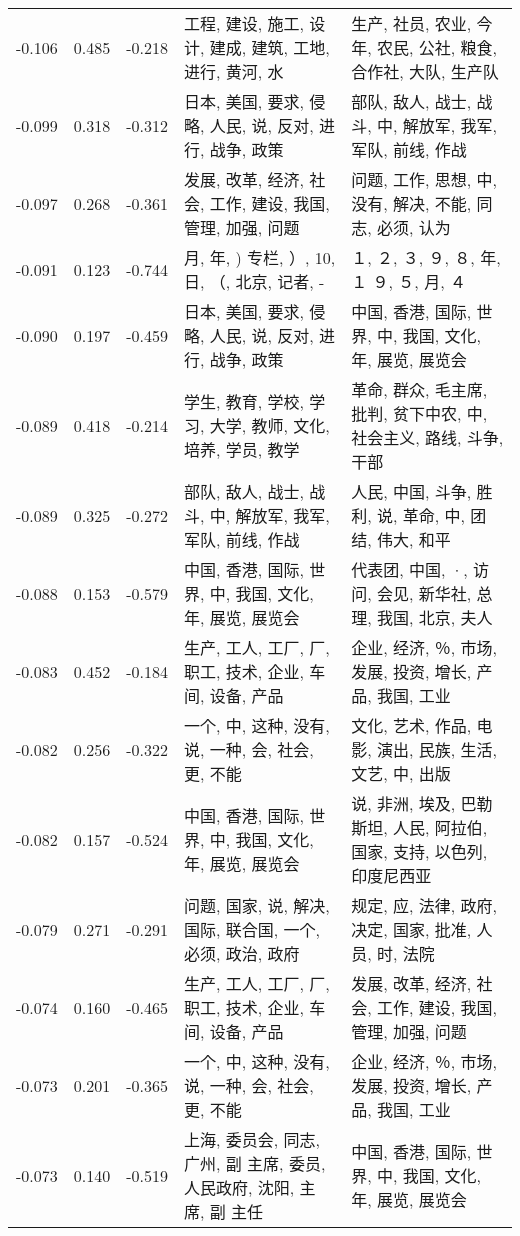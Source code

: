 \begin{tabular}{cccp{5cm}p{5cm}}
-0.106 & 0.485 & -0.218 & 工程, 建设, 施工, 设计, 建成, 建筑, 工地, 进行, 黄河, 水 & 生产, 社员, 农业, 今年, 农民, 公社, 粮食, 合作社, 大队, 生产队 \\
-0.099 & 0.318 & -0.312 & 日本, 美国, 要求, 侵略, 人民, 说, 反对, 进行, 战争, 政策 & 部队, 敌人, 战士, 战斗, 中, 解放军, 我军, 军队, 前线, 作战 \\
-0.097 & 0.268 & -0.361 & 发展, 改革, 经济, 社会, 工作, 建设, 我国, 管理, 加强, 问题 & 问题, 工作, 思想, 中, 没有, 解决, 不能, 同志, 必须, 认为 \\
-0.091 & 0.123 & -0.744 & 月, 年, ) 专栏, ）, 10, 日, （, 北京, 记者, - & １, ２, ３, ９, ８, 年, １ ９, ５, 月, ４ \\
-0.090 & 0.197 & -0.459 & 日本, 美国, 要求, 侵略, 人民, 说, 反对, 进行, 战争, 政策 & 中国, 香港, 国际, 世界, 中, 我国, 文化, 年, 展览, 展览会 \\
-0.089 & 0.418 & -0.214 & 学生, 教育, 学校, 学习, 大学, 教师, 文化, 培养, 学员, 教学 & 革命, 群众, 毛主席, 批判, 贫下中农, 中, 社会主义, 路线, 斗争, 干部 \\
-0.089 & 0.325 & -0.272 & 部队, 敌人, 战士, 战斗, 中, 解放军, 我军, 军队, 前线, 作战 & 人民, 中国, 斗争, 胜利, 说, 革命, 中, 团结, 伟大, 和平 \\
-0.088 & 0.153 & -0.579 & 中国, 香港, 国际, 世界, 中, 我国, 文化, 年, 展览, 展览会 & 代表团, 中国, ·, 访问, 会见, 新华社, 总理, 我国, 北京, 夫人 \\
-0.083 & 0.452 & -0.184 & 生产, 工人, 工厂, 厂, 职工, 技术, 企业, 车间, 设备, 产品 & 企业, 经济, ％, 市场, 发展, 投资, 增长, 产品, 我国, 工业 \\
-0.082 & 0.256 & -0.322 & 一个, 中, 这种, 没有, 说, 一种, 会, 社会, 更, 不能 & 文化, 艺术, 作品, 电影, 演出, 民族, 生活, 文艺, 中, 出版 \\
-0.082 & 0.157 & -0.524 & 中国, 香港, 国际, 世界, 中, 我国, 文化, 年, 展览, 展览会 & 说, 非洲, 埃及, 巴勒斯坦, 人民, 阿拉伯, 国家, 支持, 以色列, 印度尼西亚 \\
-0.079 & 0.271 & -0.291 & 问题, 国家, 说, 解决, 国际, 联合国, 一个, 必须, 政治, 政府 & 规定, 应, 法律, 政府, 决定, 国家, 批准, 人员, 时, 法院 \\
-0.074 & 0.160 & -0.465 & 生产, 工人, 工厂, 厂, 职工, 技术, 企业, 车间, 设备, 产品 & 发展, 改革, 经济, 社会, 工作, 建设, 我国, 管理, 加强, 问题 \\
-0.073 & 0.201 & -0.365 & 一个, 中, 这种, 没有, 说, 一种, 会, 社会, 更, 不能 & 企业, 经济, ％, 市场, 发展, 投资, 增长, 产品, 我国, 工业 \\
-0.073 & 0.140 & -0.519 & 上海, 委员会, 同志, 广州, 副 主席, 委员, 人民政府, 沈阳, 主席, 副 主任 & 中国, 香港, 国际, 世界, 中, 我国, 文化, 年, 展览, 展览会 \\

\end{tabular}
